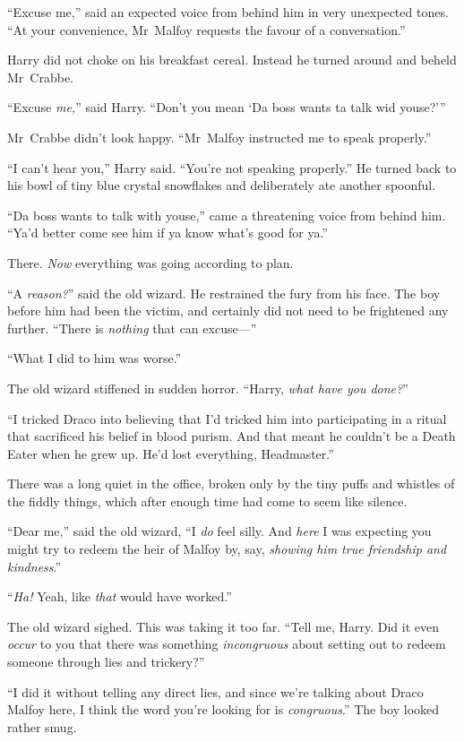 “Excuse me,” said an expected voice from behind him in very unexpected tones. “At your convenience, Mr~Malfoy requests the favour of a conversation.”

Harry did not choke on his breakfast cereal. Instead he turned around and beheld Mr~Crabbe.

“Excuse \emph{me,}” said Harry. “Don’t you mean ‘Da boss wants ta talk wid youse?’”

Mr~Crabbe didn’t look happy. “Mr~Malfoy instructed me to speak properly.”

“I can’t hear you,” Harry said. “You’re not speaking properly.” He turned back to his bowl of tiny blue crystal snowflakes and deliberately ate another spoonful.

“Da boss wants to talk with youse,” came a threatening voice from behind him. “Ya’d better come see him if ya know what’s good for ya.”

There. \emph{Now} everything was going according to plan.


“A \emph{reason?}” said the old wizard. He restrained the fury from his face. The boy before him had been the victim, and certainly did not need to be frightened any further. “There is \emph{nothing} that can excuse—”

“What I did to him was worse.”

The old wizard stiffened in sudden horror. “Harry, \emph{what have you done?}”

“I tricked Draco into believing that I’d tricked him into participating in a ritual that sacrificed his belief in blood purism. And that meant he couldn’t be a Death Eater when he grew up. He’d lost everything, Headmaster.”

There was a long quiet in the office, broken only by the tiny puffs and whistles of the fiddly things, which after enough time had come to seem like silence.

“Dear me,” said the old wizard, “I \emph{do} feel silly. And \emph{here} I was expecting you might try to redeem the heir of Malfoy by, say, \emph{showing him true friendship and kindness}.”

“\emph{Ha!} Yeah, like \emph{that} would have worked.”

The old wizard sighed. This was taking it too far. “Tell me, Harry. Did it even \emph{occur} to you that there was something \emph{incongruous} about setting out to redeem someone through lies and trickery?”

“I did it without telling any direct lies, and since we’re talking about Draco Malfoy here, I think the word you’re looking for is \emph{congruous}.” The boy looked rather smug.

